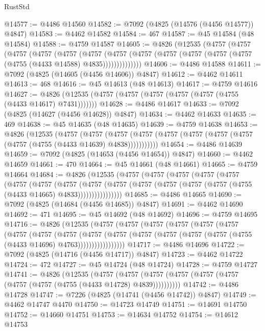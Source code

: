 \begin{lexlean}{RustStd}
\begin{coremodule}
@14577 := @4486 @14560
@14582 := @7092 (@4825 (@14576 (@4456 @14577)) @4847)
@14583 := @4462 @14582
@14584 := 467
@14587 := @45 @14584 (@48 @14584)
@14588 := @4759 @14587
@14605 := @4826
    (@12535
      (@4757
        (@4757
          (@4757
            (@4757
              (@4757
                (@4757
                  (@4757
                    (@4757 (@4757 (@4757 (@4757 (@4757 (@4755 (@4433 @14588) @4835))))))))))))))
@14606 := @4486 @14588
@14611 := @7092 (@4825 (@14605 (@4456 @14606)) @4847)
@14612 := @4462 @14611
@14613 := 468
@14616 := @45 @14613 (@48 @14613)
@14617 := @4759 @14616
@14627 := @4826 (@12535 (@4757 (@4757 (@4757 (@4757 (@4757 (@4755 (@4433 @14617) @7431)))))))
@14628 := @4486 @14617
@14633 := @7092 (@4825 (@14627 (@4456 @14628)) @4847)
@14634 := @4462 @14633
@14635 := 469
@14638 := @45 @14635 (@48 @14635)
@14639 := @4759 @14638
@14653 := @4826
    (@12535
      (@4757
        (@4757
          (@4757 (@4757 (@4757 (@4757 (@4757 (@4757 (@4757 (@4755 (@4433 @14639) @4838)))))))))))
@14654 := @4486 @14639
@14659 := @7092 (@4825 (@14653 (@4456 @14654)) @4847)
@14660 := @4462 @14659
@14661 := 470
@14664 := @45 @14661 (@48 @14661)
@14665 := @4759 @14664
@14684 := @4826
    (@12535
      (@4757
        (@4757
          (@4757
            (@4757
              (@4757
                (@4757
                  (@4757
                    (@4757
                      (@4757
                        (@4757
                          (@4757 (@4757 (@4757 (@4757 (@4755 (@4433 @14665) @4833))))))))))))))))
@14685 := @4486 @14665
@14690 := @7092 (@4825 (@14684 (@4456 @14685)) @4847)
@14691 := @4462 @14690
@14692 := 471
@14695 := @45 @14692 (@48 @14692)
@14696 := @4759 @14695
@14716 := @4826
    (@12535
      (@4757
        (@4757
          (@4757
            (@4757
              (@4757
                (@4757
                  (@4757
                    (@4757
                      (@4757
                        (@4757
                          (@4757
                            (@4757 (@4757 (@4757 (@4757 (@4755 (@4433 @14696) @4763)))))))))))))))))
@14717 := @4486 @14696
@14722 := @7092 (@4825 (@14716 (@4456 @14717)) @4847)
@14723 := @4462 @14722
@14724 := 472
@14727 := @45 @14724 (@48 @14724)
@14728 := @4759 @14727
@14741 := @4826
    (@12535
      (@4757 (@4757 (@4757 (@4757 (@4757 (@4757 (@4757 (@4757 (@4755 (@4433 @14728) @4839))))))))))
@14742 := @4486 @14728
@14747 := @7226 (@4825 (@14741 (@4456 @14742)) @4847)
@14749 := @4462 @14747 @4470
@14750 := @14723 @14749
@14751 := @14691 @14750
@14752 := @14660 @14751
@14753 := @14634 @14752
@14754 := @14612 @14753

\end{coremodule}
\end{lexlean}
